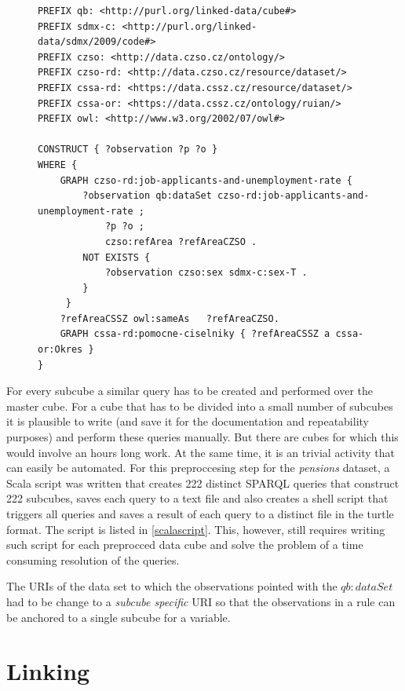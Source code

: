 \begin{figure}[h]
\begin{lstlisting}[language = SPARQL, caption={SPARQL query to create a subcube (Source: author)}, label={sparqlcutexample},captionpos=b escapeinside={(*@}{@*)}]
PREFIX qb: <http://purl.org/linked-data/cube#>
PREFIX sdmx-c: <http://purl.org/linked-data/sdmx/2009/code#>
PREFIX czso: <http://data.czso.cz/ontology/>
PREFIX czso-rd: <http://data.czso.cz/resource/dataset/>
PREFIX cssa-rd: <https://data.cssz.cz/resource/dataset/>
PREFIX cssa-or: <https://data.cssz.cz/ontology/ruian/>
PREFIX owl: <http://www.w3.org/2002/07/owl#>
    
CONSTRUCT { ?observation ?p ?o } 
WHERE { 
    GRAPH czso-rd:job-applicants-and-unemployment-rate {
        ?observation qb:dataSet czso-rd:job-applicants-and-unemployment-rate ;
            ?p ?o ;
            czso:refArea ?refAreaCZSO .
        NOT EXISTS {
            ?observation czso:sex sdmx-c:sex-T .
        }             
     }
    ?refAreaCSSZ owl:sameAs   ?refAreaCZSO.
    GRAPH cssa-rd:pomocne-ciselniky { ?refAreaCSSZ a cssa-or:Okres }
}
\end{lstlisting}
\end{figure}

For every subcube a similar query has to be created and performed over the master cube. For a cube that has to be divided into a small number of subcubes it is plausible to write (and save it for the documentation and repeatability purposes) and perform these queries manually. But there are cubes for which this would involve an hours long work. At the same time, it is an trivial activity that can easily be automated. For this preproccesing step for the \textit{pensions} dataset, a Scala script was written that creates 222 distinct SPARQL queries that construct 222 subcubes, saves each query to a text file and also creates a shell script that triggers all queries and saves a result of each query to a distinct file in the turtle format. The script is listed in \ref{scalascript}. This, however, still requires writing such script for each preprocced data cube and solve the problem of a time consuming resolution of the queries.

The URIs of the data set to which the observations pointed with the $qb:dataSet$ had to be change to a \textit{subcube specific} URI so that the observations in a rule can be anchored to a single subcube for a variable.


\section{Linking\label{linking}}

